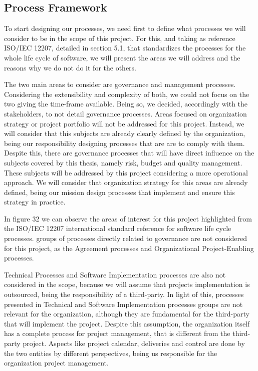 \subsection{Process Framework}

To start designing our processes, we need first to define what processes we will consider to be in the scope of this project. For this, and taking as reference ISO/IEC 12207, detailed in section 5.1, that standardizes the processes for the whole life cycle of software, we will present the areas we will address and the reasons why we do not do it for the others.\par
The two main areas to consider are governance and management processes. Considering the extensibility and complexity of both, we could not focus on the two giving the time-frame available. Being so, we decided, accordingly with the stakeholders, to not detail governance processes. Areas focused on organization strategy or project portfolio will not be addressed for this project. Instead, we will consider that this subjects are already clearly defined by the organization, being our responsibility designing processes that are are to comply with them. 
Despite this, there are governance processes that will have direct influence on the subjects covered by this thesis, namely risk, budget and quality management. These subjects will be addressed by this project considering a more operational approach. We will consider that organization strategy for this areas are already defined, being our mission design processes that implement and ensure this strategy in practice.\par
In figure 32 we can observe the areas of interest for this project highlighted from the ISO/IEC 12207 international standard reference for software life cycle processes. groups of processes directly related to governance are not considered for this project, as the Agreement processes and Organizational Project-Enabling processes.\par
Technical Processes and Software Implementation processes are also not considered in the scope, because we will assume that projects implementation is outsourced, being the responsibility of a third-party. In light of this, processes presented in Technical and Software Implementation processes groups are not relevant for the organization, although  they are fundamental for the third-party that will implement the project. Despite this assumption, the organization itself has a complete process for project management, that is different from the third-party project. Aspects like project calendar, deliveries and control are done by the two entities by different perspectives, being us responsible for the organization project management.\par
